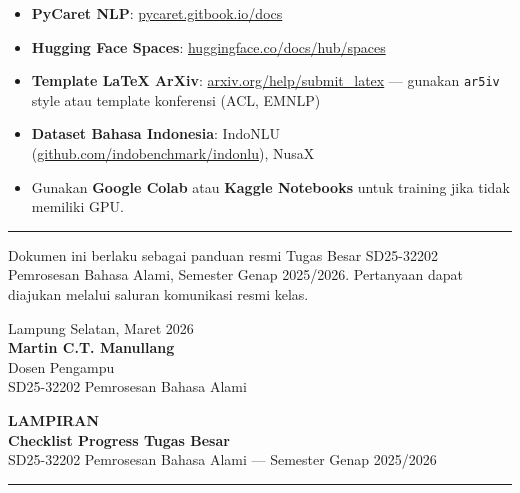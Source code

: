 \documentclass[11pt,a4paper]{article}
\begin{document}
\begin{itemize}
  \item \textbf{PyCaret NLP}: \href{https://pycaret.gitbook.io/docs/}{pycaret.gitbook.io/docs}
  \item \textbf{Hugging Face Spaces}: \href{https://huggingface.co/docs/hub/spaces}{huggingface.co/docs/hub/spaces}
  \item \textbf{Template LaTeX ArXiv}: \href{https://arxiv.org/help/submit_latex}{arxiv.org/help/submit\_latex} --- gunakan \texttt{ar5iv} style atau template konferensi (ACL, EMNLP)
  \item \textbf{Dataset Bahasa Indonesia}: IndoNLU (\href{https://github.com/indobenchmark/indonlu}{github.com/indobenchmark/indonlu}), NusaX
  \item Gunakan \textbf{Google Colab} atau \textbf{Kaggle Notebooks} untuk training jika tidak memiliki GPU.
\end{itemize}

\vspace{1em}
\noindent\color{itera}\rule{\linewidth}{0.5pt}
\vspace{0.5em}

\noindent Dokumen ini berlaku sebagai panduan resmi Tugas Besar SD25-32202 Pemrosesan Bahasa Alami, Semester Genap 2025/2026. Pertanyaan dapat diajukan melalui saluran komunikasi resmi kelas.

\vspace{1em}
\begin{flushright}
  Lampung Selatan, Maret 2026\\[6pt]
  \textbf{Martin C.T. Manullang}\\
  Dosen Pengampu\\
  SD25-32202 Pemrosesan Bahasa Alami
\end{flushright}

\newpage
\begin{center}
  {\large\bfseries\color{itera} LAMPIRAN}\\[4pt]
  {\large\bfseries Checklist Progress Tugas Besar}\\[2pt]
  {\normalsize SD25-32202 Pemrosesan Bahasa Alami --- Semester Genap 2025/2026}
\end{center}
\vspace{0.5em}
\noindent\color{itera}\rule{\linewidth}{1pt}
\vspace{0.5em}
\end{document}
